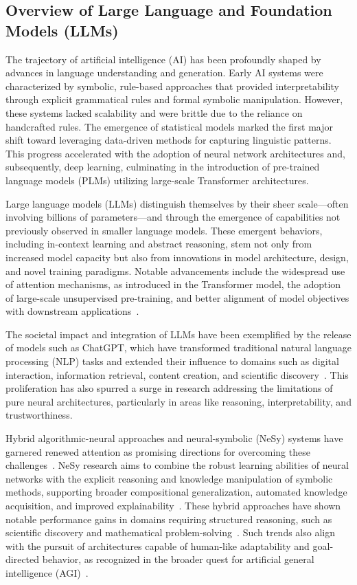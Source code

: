 \documentclass[sigconf]{acmart}
\begin{document}
\subsection{Overview of Large Language and Foundation Models (LLMs)}

The trajectory of artificial intelligence (AI) has been profoundly shaped by advances in language understanding and generation. Early AI systems were characterized by symbolic, rule-based approaches that provided interpretability through explicit grammatical rules and formal symbolic manipulation. However, these systems lacked scalability and were brittle due to the reliance on handcrafted rules. The emergence of statistical models marked the first major shift toward leveraging data-driven methods for capturing linguistic patterns. This progress accelerated with the adoption of neural network architectures and, subsequently, deep learning, culminating in the introduction of pre-trained language models (PLMs) utilizing large-scale Transformer architectures.

Large language models (LLMs) distinguish themselves by their sheer scale—often involving billions of parameters—and through the emergence of capabilities not previously observed in smaller language models. These emergent behaviors, including in-context learning and abstract reasoning, stem not only from increased model capacity but also from innovations in model architecture, design, and novel training paradigms. Notable advancements include the widespread use of attention mechanisms, as introduced in the Transformer model, the adoption of large-scale unsupervised pre-training, and better alignment of model objectives with downstream applications~\cite{ref42}.

The societal impact and integration of LLMs have been exemplified by the release of models such as ChatGPT, which have transformed traditional natural language processing (NLP) tasks and extended their influence to domains such as digital interaction, information retrieval, content creation, and scientific discovery~\cite{ref42}. This proliferation has also spurred a surge in research addressing the limitations of pure neural architectures, particularly in areas like reasoning, interpretability, and trustworthiness.

Hybrid algorithmic-neural approaches and neural-symbolic (NeSy) systems have garnered renewed attention as promising directions for overcoming these challenges~\cite{ref49,ref86}. NeSy research aims to combine the robust learning abilities of neural networks with the explicit reasoning and knowledge manipulation of symbolic methods, supporting broader compositional generalization, automated knowledge acquisition, and improved explainability~\cite{ref49}. These hybrid approaches have shown notable performance gains in domains requiring structured reasoning, such as scientific discovery and mathematical problem-solving~\cite{ref49,ref86}. Such trends also align with the pursuit of architectures capable of human-like adaptability and goal-directed behavior, as recognized in the broader quest for artificial general intelligence (AGI)~\cite{ref54}.
\end{document}
